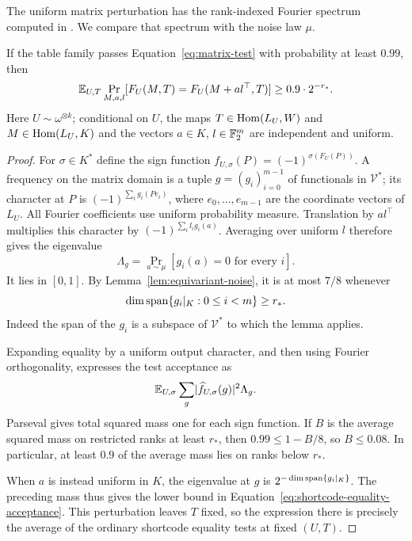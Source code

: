 The uniform matrix perturbation has the rank-indexed Fourier spectrum
computed in \cite[Lemma~2.10 in the 2018 revision]{KMS23}. We compare
that spectrum with the noise law $\mu$.

\begin{lemma}
\label{lem:matrix-spectral}
If the table family passes Equation~\eqref{eq:matrix-test} with probability at
least $0.99$, then
\begin{equation}
 \mathbb E_{U,T}\Pr_{M,a,l}
   [F_U(M,T)=F_U(M+a l^\top,T)]
 \ge 0.9\cdot2^{-r_*}.
 \label{eq:shortcode-equality-acceptance}
\end{equation}
Here $U\sim\omega^{\otimes k}$; conditional on $U$, the maps
$T\in\operatorname{Hom}(L_U,W)$ and $M\in\operatorname{Hom}(L_U,K)$ and the vectors $a\in K$,
$l\in\mathbb F_2^m$ are independent and uniform.
\end{lemma}

\begin{proof}
For $\sigma\in K^*$ define the sign function
$f_{U,\sigma}(P)=(-1)^{\sigma(F_U(P))}$.  A frequency on the matrix
domain is a tuple $g=(g_i)_{i=0}^{m-1}$ of functionals in $\mathcal V^*$;
its character at $P$ is $(-1)^{\sum_i g_i(Pe_i)}$, where
$e_0,\ldots,e_{m-1}$ are the coordinate vectors of $L_U$.  All Fourier
coefficients use uniform probability measure.  Translation by $a l^\top$
multiplies this character by $(-1)^{\sum_i l_i g_i(a)}$.  Averaging over
uniform $l$ therefore gives the eigenvalue
\[
 \Lambda_g=\Pr_{a\sim\mu}[g_i(a)=0\text{ for every }i].
\]
It lies in $[0,1]$.  By Lemma~\ref{lem:equivariant-noise}, it is at most $7/8$
whenever
\[
 \dim\operatorname{span}\{g_i|_K:0\le i<m\}\ge r_*.
\]
Indeed the span of the $g_i$ is a subspace of $\mathcal V^*$ to which
the lemma applies.

Expanding equality by a uniform output character, and then using Fourier
orthogonality, expresses the test acceptance as
\[
 \mathbb E_{U,\sigma}\sum_g
      \lvert \widehat f_{U,\sigma}(g)\rvert^2\Lambda_g.
\]
Parseval gives total squared mass one for each sign function.  If $B$ is
the average squared mass on restricted ranks at least $r_*$, then
$0.99\le1-B/8$, so $B\le0.08$.  In particular, at least $0.9$ of the
average mass lies on ranks below $r_*$.

When $a$ is instead uniform in $K$, the eigenvalue at $g$ is
$2^{-\dim\operatorname{span}\{g_i|_K\}}$.  The preceding mass thus gives the lower
bound in Equation~\eqref{eq:shortcode-equality-acceptance}.  This perturbation
leaves $T$ fixed, so the expression there is precisely the average of the
ordinary shortcode equality tests at fixed $(U,T)$.
\end{proof}

